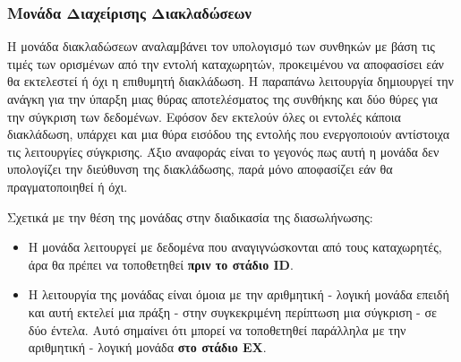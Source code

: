 \documentclass[11pt]{extarticle}
\begin{document}
\subsubsection{Μονάδα Διαχείρισης Διακλαδώσεων}
Η μονάδα διακλαδώσεων αναλαμβάνει τον υπολογισμό των συνθηκών με βάση τις τιμές των ορισμένων από την εντολή καταχωρητών, προκειμένου να αποφασίσει εάν θα εκτελεστεί ή όχι η επιθυμητή διακλάδωση.
Η παραπάνω λειτουργία δημιουργεί την ανάγκη για την ύπαρξη μιας θύρας αποτελέσματος της συνθήκης και δύο θύρες για την σύγκριση των δεδομένων.
Εφόσον δεν εκτελούν όλες οι εντολές κάποια διακλάδωση, υπάρχει και μια θύρα εισόδου της εντολής που ενεργοποιούν αντίστοιχα τις λειτουργίες σύγκρισης.
Άξιο αναφοράς είναι το γεγονός πως αυτή η μονάδα δεν υπολογίζει την διεύθυνση της διακλάδωσης\footnotemark, παρά μόνο αποφασίζει εάν θα πραγματοποιηθεί ή όχι.

Σχετικά με την θέση της μονάδας στην διαδικασία της διασωλήνωσης:
 \begin{itemize}
    \item Η μονάδα λειτουργεί με δεδομένα που αναγιγνώσκονται από τους καταχωρητές, άρα θα πρέπει να τοποθετηθεί \textbf{πριν το στάδιο ID}.
    \item Η λειτουργία της μονάδας είναι όμοια με την αριθμητική - λογική μονάδα επειδή και αυτή εκτελεί μια πράξη - στην συγκεκριμένη περίπτωση μια σύγκριση - σε δύο έντελα. 
    Αυτό σημαίνει ότι μπορεί να τοποθετηθεί παράλληλα με την αριθμητική - λογική μονάδα \textbf{στο στάδιο EX}.
 \end{itemize}
\end{document}
